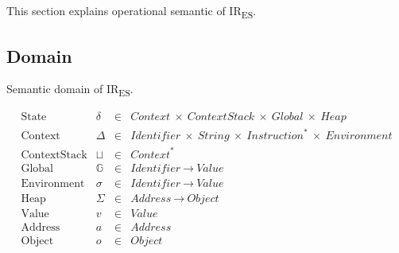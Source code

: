 \documentclass[11pt]{article}
\newcommand{\irname}[0]{IR\textsubscript{ES}\xspace}
\newcommand{\symstate}[0]{\delta}
\newcommand{\symctx}[0]{\Delta}
\newcommand{\symctxstack}[0]{\sqcup}
\newcommand{\symglb}[0]{\mathbb{G}}
\newcommand{\symenv}[0]{\sigma}
\newcommand{\symheap}[0]{\Sigma}
\begin{document}
This section explains operational semantic of \irname.

\subsection{Domain}

Semantic domain of \irname.

\[
\begin{array}{rrrl}
\text{State} & \symstate & \in &
\textit{Context}\ \times\ \textit{ContextStack}\
\times\ \textit{Global}\ \times\ \textit{Heap}
\\
\text{Context} & \symctx & \in &
\textit{Identifier}\ \times\ \textit{String}\
\times\ \textit{Instruction}^*\ \times\ \textit{Environment}
\\
\text{ContextStack} & \symctxstack & \in & \textit{Context}^*
\\
\text{Global} & \symglb & \in &
\textit{Identifier}\ \to\ \textit{Value}
\\
\text{Environment} & \symenv & \in &
\textit{Identifier}\ \to\ \textit{Value}
\\
\text{Heap} & \symheap & \in &
\textit{Address}\ \to\ \textit{Object}
\\
\text{Value} & v & \in & \textit{Value}
\\
\text{Address} & a & \in & \textit{Address}
\\
\text{Object} & o & \in & \textit{Object}
\\

\end{array}
\]
\end{document}
